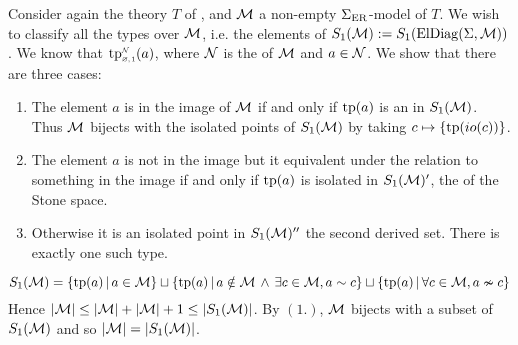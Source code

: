 \begin{eg}
    Consider again the theory $T$ of 
    ,
    and $\mathcal{M}$ a non-empty $\Sigma_{\mathrm{ER}}$-model of $T$. 
    We wish to classify all the types over $\mathcal{M}$, i.e. the elements of 
    $S_1(\mathcal{M}) := S_1(\mathrm{ElDiag}(\Sigma,\mathcal{M}))$.
    We know that
        $\subintp{\nothing,1}{\NN}{\tp}(a)$, 
    where $\mathcal{N}$ is the 
        of $\mathcal{M}$ and $a \in \mathcal{N}$.
    We show that there are three cases:
    \begin{enumerate}
        \item The element $a$ is in the image of $\mathcal{M}$ if and only if 
            $\operatorname{tp}(a)$ is an  
            in $S_1(\mathcal{M})$.
            Thus $\mathcal{M}$ bijects with the isolated points of $S_1(\mathcal{M})$
            by taking $c \mapsto \left\{\operatorname{tp}(io(c))\right\}$.
        \item The element $a$ is not in the image but it equivalent under the 
            relation to something
            in the image if and only if $\operatorname{tp}(a)$ is isolated in $S_1(\mathcal{M})'$,
            the  of the Stone space.
        \item Otherwise it is an isolated point 
            in $S_1(\mathcal{M})''$ the second derived set. 
            There is exactly one such type.
    \end{enumerate}
    \[  
        S_1(\mathcal{M}) = \left\{\operatorname{tp}(a) \,|\, a \in \mathcal{M}\right\} \sqcup 
        \left\{\operatorname{tp}(a) \,|\, a \notin \mathcal{M} \, \land \, \exists c \in \mathcal{M}, a \sim c\right\} \sqcup
        \left\{\operatorname{tp}(a) \,|\, \forall c \in \mathcal{M}, a \nsim c\right\}
    \]
    Hence $\left\vert \mathcal{M} \right\vert \leq \left\vert \mathcal{M} \right\vert + \left\vert \mathcal{M} \right\vert + 1 \leq \left\vert S_1(\mathcal{M}) \right\vert$.
    By $(1.)$, $\mathcal{M}$ bijects with a subset of $S_1(\mathcal{M})$ and so 
    $\left\vert \mathcal{M} \right\vert = \left\vert S_1(\mathcal{M}) \right\vert$.
\end{eg}
